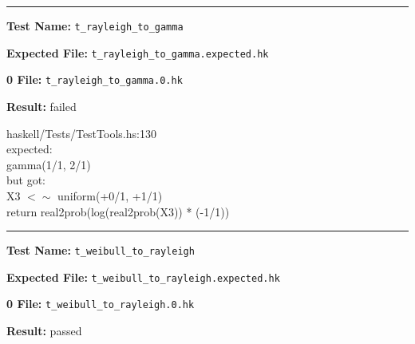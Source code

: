 \documentclass[11pt]{article}
\begin{document}
\hrule

\bigskip
\textbf{Test Name:} {\tt t\_rayleigh\_to\_gamma}

\textbf{Expected File:} {\tt t\_rayleigh\_to\_gamma.expected.hk}

\bigskip


\bigskip
\textbf{0 File:} {\tt t\_rayleigh\_to\_gamma.0.hk}

\bigskip


\bigskip
\textbf{Result:} failed

\bigskip
\noindent


\bigskip
\noindent
haskell/Tests/TestTools.hs:130\\expected:\\gamma(1/1, 2/1)\\but got:\\X3 $<\sim$ uniform(+0/1, +1/1)\\return real2prob(log(real2prob(X3)) * (-1/1))\\

\hrule

\bigskip
\textbf{Test Name:} {\tt t\_weibull\_to\_rayleigh}

\textbf{Expected File:} {\tt t\_weibull\_to\_rayleigh.expected.hk}

\bigskip


\bigskip
\textbf{0 File:} {\tt t\_weibull\_to\_rayleigh.0.hk}

\bigskip


\bigskip
\textbf{Result:} passed

\bigskip
\end{document}

